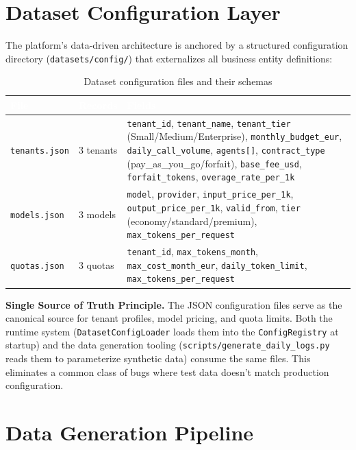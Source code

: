 \documentclass[12pt,a4paper,twoside]{report}
\begin{document}
\section{Dataset Configuration Layer}

The platform's data-driven architecture is anchored by a structured configuration directory (\texttt{datasets/config/}) that externalizes all business entity definitions:

\begin{table}[H]
\centering
\small
\begin{tabularx}{\textwidth}{|l|l|X|}
\hline
\rowcolor{tabheader}
\textcolor{white}{\textbf{File}} &
\textcolor{white}{\textbf{Records}} &
\textcolor{white}{\textbf{Fields}} \\
\hline
\texttt{tenants.json} & 3 tenants & \texttt{tenant\_id}, \texttt{tenant\_name}, \texttt{tenant\_tier} (Small/Medium/Enterprise), \texttt{monthly\_budget\_eur}, \texttt{daily\_call\_volume}, \texttt{agents[]}, \texttt{contract\_type} (pay\_as\_you\_go/forfait), \texttt{base\_fee\_usd}, \texttt{forfait\_tokens}, \texttt{overage\_rate\_per\_1k} \\
\hline
\texttt{models.json} & 3 models & \texttt{model}, \texttt{provider}, \texttt{input\_price\_per\_1k}, \texttt{output\_price\_per\_1k}, \texttt{valid\_from}, \texttt{tier} (economy/standard/premium), \texttt{max\_tokens\_per\_request} \\
\hline
\texttt{quotas.json} & 3 quotas & \texttt{tenant\_id}, \texttt{max\_tokens\_month}, \texttt{max\_cost\_month\_eur}, \texttt{daily\_token\_limit}, \texttt{max\_tokens\_per\_request} \\
\hline
\end{tabularx}
\caption{Dataset configuration files and their schemas}
\end{table}

\textbf{Single Source of Truth Principle.} The JSON configuration files serve as the canonical source for tenant profiles, model pricing, and quota limits. Both the runtime system (\texttt{DatasetConfigLoader} loads them into the \texttt{ConfigRegistry} at startup) and the data generation tooling (\texttt{scripts/generate\_daily\_logs.py} reads them to parameterize synthetic data) consume the same files. This eliminates a common class of bugs where test data doesn't match production configuration.

\section{Data Generation Pipeline}
\end{document}
